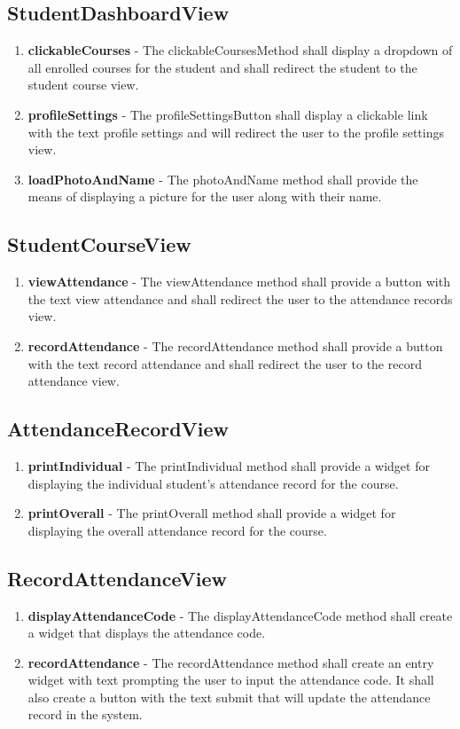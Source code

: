 \documentclass[letterpaper,12pt,oneside,listof=totoc]{scrreprt}
\begin{document}
\subsection{StudentDashboardView}
\begin{enumerate}
    \item \textbf{clickableCourses} - The clickableCoursesMethod shall display a dropdown of all enrolled courses for the student and shall redirect the student to the student course view.
    \item \textbf{profileSettings} - The profileSettingsButton shall display a clickable link with the text profile settings and will redirect the user to the profile settings view.
    \item \textbf{loadPhotoAndName} - The photoAndName method shall provide the means of displaying a picture for the user along with their name.
\end{enumerate}

\subsection{StudentCourseView}
\begin{enumerate}
    \item \textbf{viewAttendance} - The viewAttendance method shall provide a button with the text view attendance and shall redirect the user to the attendance records view.
    \item \textbf{recordAttendance} - The recordAttendance method shall provide a button with the text record attendance and shall redirect the user to the record attendance view.
\end{enumerate}

\subsection{AttendanceRecordView}
\begin{enumerate}
    \item \textbf{printIndividual} - The printIndividual method shall provide a widget for displaying the individual student's attendance record for the course.
    \item \textbf{printOverall} - The printOverall method shall provide a widget for displaying the overall attendance record for the course.
\end{enumerate}

\subsection{RecordAttendanceView}
\begin{enumerate}
    \item \textbf{displayAttendanceCode} - The displayAttendanceCode method shall create a widget that displays the attendance code.
    \item \textbf{recordAttendance} - The recordAttendance method shall create an entry widget with text prompting the user to input the attendance code. It shall also create a button with the text submit that will update the attendance record in the system.
\end{enumerate}
\end{document}

